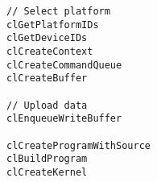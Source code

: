 \lstset{language=C++}
\begin{lstlisting}
// Select platform
clGetPlatformIDs
clGetDeviceIDs
clCreateContext
clCreateCommandQueue
clCreateBuffer

// Upload data
clEnqueueWriteBuffer

clCreateProgramWithSource
clBuildProgram
clCreateKernel
\end{lstlisting}